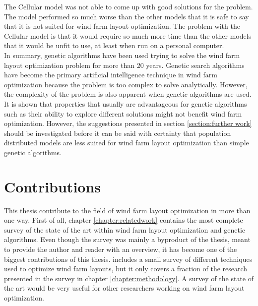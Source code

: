 \noindent The Cellular model was not able to come up with good solutions for the problem. The model performed so much worse than the other models that it is safe to say that it is not suited for wind farm layout optimization. The problem with the Cellular model is that it would require so much more time than the other models that it would be unfit to use, at least when run on a personal computer.\\

\noindent In summary, genetic algorithms have been used trying to solve the wind farm layout optimization problem for more than 20 years. Genetic search algorithms have become the primary artificial intelligence technique in wind farm optimization because the problem is too complex to solve analytically. However, the complexity of the problem is also apparent when genetic algorithms are used. It is shown that properties that usually are advantageous for genetic algorithms such as  their ability to explore different solutions might not benefit wind farm optimization. However, the suggestions presented in section \ref{section:further work} should be investigated before it can be said with certainty that population distributed models are less suited for wind farm layout optimization than simple genetic algorithms.\\


\section{Contributions}\label{section:contributions}
This thesis contribute to the field of wind farm layout optimization in more than one way. First of all, chapter \ref{chapter:relatedwork} contains the most complete survey of the state of the art within wind farm layout optimization and genetic algorithms. Even though the survey was mainly a byproduct of the thesis, meant to provide the author and reader with an overview, it has become one of the biggest contributions of this thesis. \cite{Samorani} includes a small survey of different techniques used to optimize wind farm layouts, but it only covers a fraction of the research presented in the survey in chapter \ref{chapter:methodology}. A survey of the state of the art would be very useful for other researchers working on wind farm layout optimization.\\

